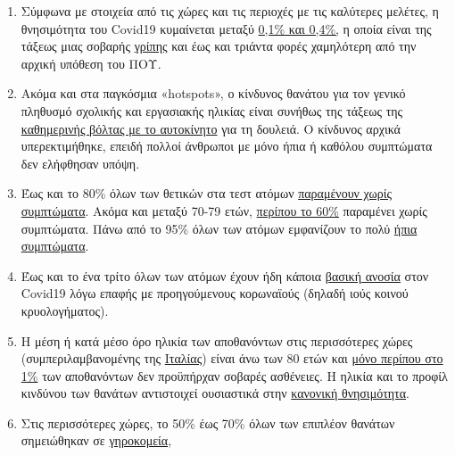 \begin{enumerate}
\def\labelenumi{\arabic{enumi}.}
\tightlist
\item
  Σύμφωνα με στοιχεία από τις χώρες και τις περιοχές με τις καλύτερες
  μελέτες, η θνησιμότητα του Covid19 κυμαίνεται μεταξύ
  \href{https://swprs.org/studies-on-covid-19-lethality/}{0,1\% και
  0,4\%,} η οποία είναι της τάξεως μιας σοβαρής
  \href{https://www.ebm-netzwerk.de/en/publications/covid-19}{γρίπης}
  και έως και τριάντα φορές χαμηλότερη από την αρχική υπόθεση του ΠΟΥ.
\item
  Ακόμα και στα παγκόσμια «hotspots», ο κίνδυνος θανάτου για τον γενικό
  πληθυσμό σχολικής και εργασιακής ηλικίας είναι συνήθως της τάξεως της
  \href{https://www.medrxiv.org/content/10.1101/2020.04.05.20054361v1}{καθημερινής
  βόλτας με το αυτοκίνητο} για τη δουλειά. Ο κίνδυνος αρχικά
  υπερεκτιμήθηκε, επειδή πολλοί άνθρωποι με μόνο ήπια ή καθόλου
  συμπτώματα δεν ελήφθησαν υπόψη.
\item
  Έως και το 80\% όλων των θετικών στα τεστ ατόμων
  \href{https://www.bmj.com/content/369/bmj.m1375}{παραμένουν χωρίς
  συμπτώματα}. Ακόμα και μεταξύ 70-79 ετών,
  \href{https://www.niid.go.jp/niid/en/2019-ncov-e/9407-covid-dp-fe-01.html}{περίπου
  το 60\%} παραμένει χωρίς συμπτώματα. Πάνω από το 95\% όλων των ατόμων
  εμφανίζουν το πολύ
  \href{https://swprs.org/studies-on-covid-19-lethality/\#hospitalizations}{ήπια
  συμπτώματα}.
\item
  Έως και το ένα τρίτο όλων των ατόμων έχουν ήδη κάποια
  \href{https://www.medrxiv.org/content/10.1101/2020.04.17.20061440v1}{βασική
  ανοσία} στον Covid19 λόγω επαφής με προηγούμενους κορωναϊούς (δηλαδή
  ιούς κοινού κρυολογήματος).
\item
  Η μέση ή κατά μέσο όρο ηλικία των αποθανόντων στις περισσότερες χώρες
  (συμπεριλαμβανομένης της
  \href{https://www.epicentro.iss.it/coronavirus/sars-cov-2-decessi-italia}{Ιταλίας})
  είναι άνω των 80 ετών και
  \href{https://www.bloomberg.com/news/articles/2020-03-18/99-of-those-who-died-from-virus-had-other-illness-italy-says}{μόνο
  περίπου στο 1\%} των αποθανόντων δεν προϋπήρχαν σοβαρές ασθένειες. Η
  ηλικία και το προφίλ κινδύνου των θανάτων αντιστοιχεί ουσιαστικά στην
  \href{https://www.vienna.at/analyse-zeigt-covid-19-opferkurve-entspricht-normaler-mortalitaet/6581246}{κανονική
  θνησιμότητα}.
\item
  Στις περισσότερες χώρες, το 50\% έως 70\% όλων των επιπλέον θανάτων
  σημειώθηκαν σε
  \href{https://ltccovid.org/2020/04/12/mortality-associated-with-covid-19-outbreaks-in-care-homes-early-international-evidence/}{γηροκομεία},

\end{enumerate}
